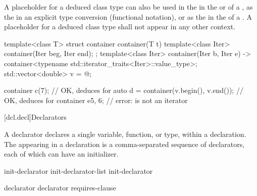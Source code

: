\pnum
A placeholder for a deduced class type
can also be used
in the 
in the  or 
of a ,
as the 
in an explicit type conversion (functional notation),
or
as the  in the 
of a .
A placeholder for a deduced class type
shall not appear in any other context.

\pnum
\begin{example}
\begin{codeblock}
template<class T> struct container {
    container(T t) {}
    template<class Iter> container(Iter beg, Iter end);
};
template<class Iter>
container(Iter b, Iter e) -> container<typename std::iterator_traits<Iter>::value_type>;
std::vector<double> v = { @\commentellip@ };

container c(7);                         // OK, deduces  for 
auto d = container(v.begin(), v.end()); // OK, deduces  for 
container e{5, 6};                      // error:  is not an iterator
\end{codeblock}
\end{example}
%

[dcl.decl]{Declarators}%

%
%
%
%
%

\pnum
A declarator declares a single variable, function, or type, within a declaration.
The
appearing in a declaration
is a comma-separated sequence of declarators,
each of which can have an initializer.

\begin{bnf}
\br
    init-declarator\br
    init-declarator-list \terminal{,} init-declarator
\end{bnf}

\begin{bnf}
\br
    declarator \br
    declarator requires-clause
\end{bnf}

